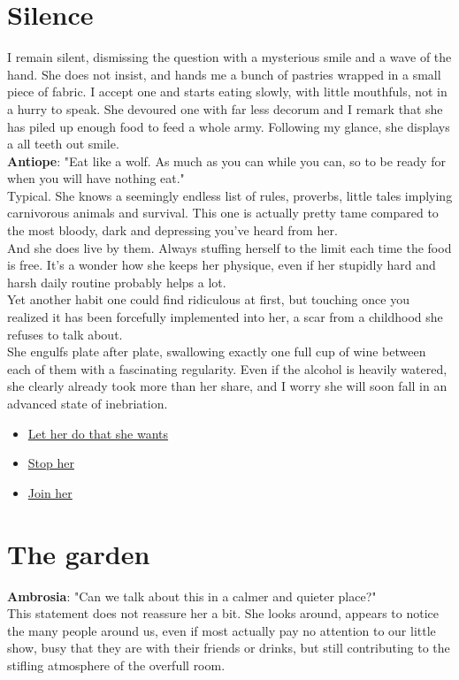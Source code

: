 \documentclass{report}
\newcommand{\speaker}[1]{
	\textbf{#1}: 
}
\newcommand{\glink}[2]{
	\hyperref[#1]{#2}
}
\newcommand{\gsection}[1]{
	\section*{#1}
	\label{#1}
}
\begin{document}
\gsection{Silence}

I remain silent, dismissing the question with a mysterious smile and a wave of the hand. She does not insist, and hands me a bunch of pastries wrapped in a small piece of fabric. I accept one and starts eating slowly, with little mouthfuls, not in a hurry to speak. She devoured one with far less decorum and I remark that she has piled up enough food to feed a whole army. Following my glance, she displays a all teeth out smile.\\

\speaker{Antiope} "Eat like a wolf. As much as you can while you can, so to be ready for when you will have nothing eat."\\

Typical. She knows a seemingly endless list of rules, proverbs, little tales implying carnivorous animals and survival. This one is actually pretty tame compared to the most bloody, dark and depressing you've heard from her.\\

And she does live by them. Always stuffing herself to the limit each time the food is free. It's a wonder how she keeps her physique, even if her stupidly hard and harsh daily routine probably helps a lot.\\

Yet another habit one could find ridiculous at first, but touching once you realized it has been forcefully implemented into her, a scar from a childhood she refuses to talk about.\\

She engulfs plate after plate, swallowing exactly one full cup of wine between each of them with a fascinating regularity. Even if the alcohol is heavily watered, she clearly already took more than her share, and I worry she will soon fall in an advanced state of inebriation.

\begin{itemize}
	\item \glink{Stupor}{Let her do that she wants}
	\item \glink{Sobriety}{Stop her}
	\item \glink{Drunk}{Join her}
\end{itemize}


\gsection{The garden}

\speaker{Ambrosia} "Can we talk about this in a calmer and quieter place?"\\

This statement does not reassure her a bit. She looks around, appears to notice the many people around us, even if most actually pay no attention to our little show, busy that they are with their friends or drinks, but still contributing to the stifling atmosphere of the overfull room.\\
\end{document}
